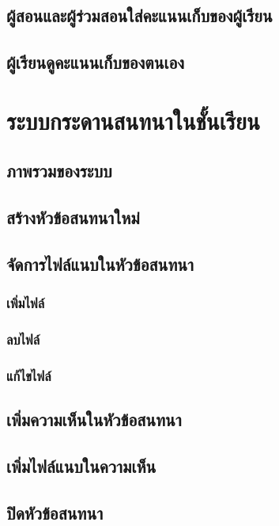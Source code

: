 \documentclass[12pt,oneside]{book}
\begin{document}
\section{ผู้สอนและผู้ร่วมสอนใส่คะแนนเก็บของผู้เรียน}

\section{ผู้เรียนดูคะแนนเก็บของตนเอง}

\chapter{ระบบกระดานสนทนาในชั้นเรียน}

\section{ภาพรวมของระบบ}

\section{สร้างหัวข้อสนทนาใหม่}

\section{จัดการไฟล์แนบในหัวข้อสนทนา}

\subsection{เพิ่มไฟล์}

\subsection{ลบไฟล์}

\subsection{แก้ไขไฟล์}

\section{เพิ่มความเห็นในหัวข้อสนทนา}

\section{เพิ่มไฟล์แนบในความเห็น}

\section{ปิดหัวข้อสนทนา}
\end{document}
